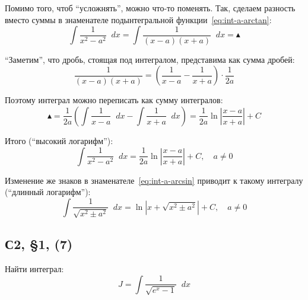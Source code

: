 \documentclass[a4paper,12pt]{article}
\newcommand{\diff}{\mathop{}\!d\!}
\begin{document}
  \begin{example}
    Помимо того, чтоб ``усложнять'', можно что-то поменять.
    Так, сделаем разность вместо суммы в знаменателе подынтегральной функции~\eqref{eq:int-a-arctan}:
    \[
      \int \frac{1}{x^2 - a^2} \diff x = \int \frac{1}{(x - a) (x + a)} \diff x = \blacktriangle
    \]
    
    ``Заметим'', что дробь, стоящая под интегралом, представима как сумма дробей:
    \[
      \frac{1}{(x - a) (x + a)} = \left(\frac{1}{x - a} - \frac{1}{x + a}\right) \cdot \frac{1}{2a}
    \]
    
    Поэтому интеграл можно переписать как сумму интегралов:
    \[
      \blacktriangle = \frac{1}{2a} \left(\int \frac{1}{x - a} \diff x - \int \frac{1}{x + a} \diff x\right)
        = \frac{1}{2a} \ln \left| \frac{x - a}{x + a} \right| + C
    \]
    
    Итого (``высокий логарифм''):  
    \begin{equation}
      \int \frac{1}{x^2 - a^2} \diff x = \frac{1}{2a} \ln \left| \frac{x - a}{x + a} \right| + C,\quad a \not= 0
    \end{equation}
  \end{example}
  
  Изменение же знаков в знаменателе~\eqref{eq:int-a-arcsin} приводит к такому интегралу (``длинный логарифм''):
  \begin{equation}
    \int \frac{1}{\sqrt{x^2 \pm a^2}} \diff x = \ln \left|x + \sqrt{x^2 \pm a^2}\right| + C,\quad a \not= 0
  \end{equation}
  
  
  \subsection{С2, \S 1, (7)}
  
  Найти интеграл:
  \[
    J = \int \frac{1}{\sqrt{e^x - 1}} \diff x
  \]
  
\end{document}
